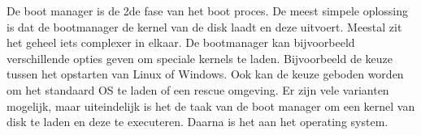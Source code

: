 De boot manager is de 2de fase van het boot proces. De meest simpele oplossing is dat de bootmanager de kernel van de disk laadt en deze uitvoert. Meestal zit het geheel iets complexer in elkaar. De bootmanager kan bijvoorbeeld verschillende opties geven om speciale kernels te laden. Bijvoorbeeld de keuze tussen het opstarten van Linux of Windows. Ook kan de keuze geboden worden om het standaard OS te laden of een rescue omgeving. Er zijn vele varianten mogelijk, maar uiteindelijk is het de taak van de boot manager om een kernel van disk te laden en deze te executeren. Daarna is het aan het operating system.

